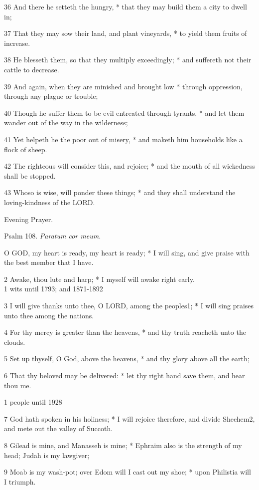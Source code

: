 36 And there he setteth the hungry, * that they may
build them a city to dwell in;

37 That they may sow their land, and plant vineyards,
* to yield them fruits of increase.

38 He blesseth them, so that they multiply exceedingly;
* and suffereth not their cattle to decrease.

39 And again, when they are minished and brought low
* through oppression, through any plague or trouble;

40 Though he suffer them to be evil entreated through
tyrants, * and let them wander out of the way in the wilderness;

41 Yet helpeth he the poor out of misery, * and maketh
him households like a flock of sheep.

42 The righteous will consider this, and rejoice; *
and the mouth of all wickedness shall be stopped.

43 Whoso is wise, will ponder these things; * and they
shall understand the loving-kindness of the LORD.

Evening
Prayer.

Psalm
108. \emph{Paratum cor meum.}

O
GOD, my heart is ready, my heart is ready; * I will sing, and give praise
with the best member that I have.

2 Awake, thou lute and harp; * I myself will awake
right early. \\
1
wits until
1793; and 1871-1892

3 I will give thanks unto thee, O LORD, among the
peoples1; * I will sing praises unto thee among the nations.

4 For thy mercy is greater than the heavens, * and thy
truth reacheth unto the clouds.

5 Set up thyself, O God, above the heavens, * and thy
glory above all the earth;

6 That thy beloved may be delivered: * let thy right
hand save them, and hear thou me.

1
people
until 1928

7 God hath spoken in his holiness; * I will rejoice therefore, and divide
Shechem2, and mete out the valley of Succoth.

8 Gilead is mine, and Manasseh is mine; * Ephraim also
is the strength of my head; Judah is my lawgiver;

9 Moab is my wash-pot; over Edom will I cast out my
shoe; * upon Philistia will I triumph.


